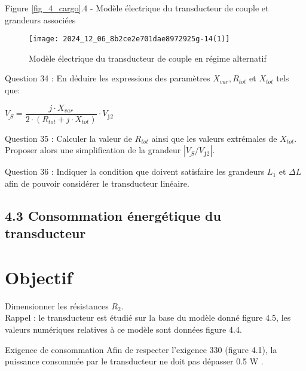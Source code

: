 Figure \ref{fig_4_cargo}.4 - Modèle électrique du transducteur de couple et grandeurs associées\\

\begin{figure}[!htb]
\begin{center}
\texttt{[image: 2024\_12\_06\_8b2ce2e701dae8972925g-14(1)]}
\caption{Modèle électrique du transducteur de couple en régime alternatif \label{fig10}}
\end{center}
\end{figure}


\ifprof
\begin{corrige}

\end{corrige}

\else
Question 34 : En déduire les expressions des paramètres \(X_{v a r}, R_{t o t}\) et \(X_{t o t}\) tels que:

$
\underline{V_{S}}=\dfrac{j \cdot X_{v a r}}{2 \cdot\left(R_{t o t}+j \cdot X_{t o t}\right)} \cdot \underline{V_{12}}
$

Question 35 : Calculer la valeur de \(R_{t o t}\) ainsi que les valeurs extrémales de \(X_{t o t}\). Proposer alors une simplification de la grandeur \(\left|\underline{V_{S}} / \underline{V_{12}}\right|\).

Question 36 : Indiquer la condition que doivent satisfaire les grandeurs \(L_{1}\) et \(\Delta L\) afin de pouvoir considérer le transducteur linéaire.

\subsection{4.3 Consommation énergétique du transducteur}
\section{Objectif}
Dimensionner les résistances \(R_{2}\).\\
Rappel : le transducteur est étudié sur la base du modèle donné figure 4.5, les valeurs numériques relatives à ce modèle sont données figure 4.4.

Exigence de consommation Afin de respecter l'exigence 330 (figure 4.1), la puissance consommée par le transducteur ne doit pas dépasser 0.5 W .

